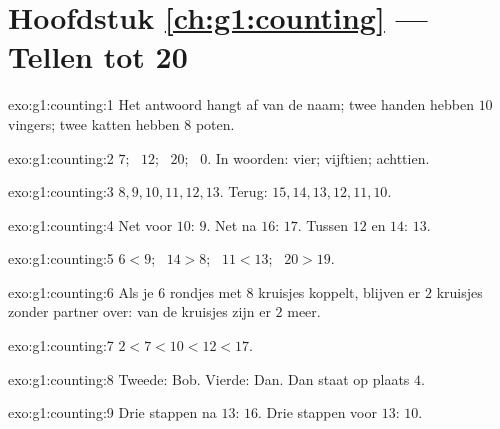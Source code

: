 \section*{Hoofdstuk \ref{ch:g1:counting} --- Tellen tot 20}

\begin{solution}{exo:g1:counting:1}
Het antwoord hangt af van de naam; twee handen hebben $10$ vingers;
twee katten hebben $8$ poten.
\end{solution}

\begin{solution}{exo:g1:counting:2}
$7$; \ $12$; \ $20$; \ $0$. In woorden: vier; vijftien; achttien.
\end{solution}

\begin{solution}{exo:g1:counting:3}
$8, 9, 10, 11, 12, 13$. Terug: $15, 14, 13, 12, 11, 10$.
\end{solution}

\begin{solution}{exo:g1:counting:4}
Net voor $10$: $9$. Net na $16$: $17$. Tussen $12$ en $14$: $13$.
\end{solution}

\begin{solution}{exo:g1:counting:5}
$6 < 9$; \ $14 > 8$; \ $11 < 13$; \ $20 > 19$.
\end{solution}

\begin{solution}{exo:g1:counting:6}
Als je $6$ rondjes met $8$ kruisjes koppelt, blijven er $2$ kruisjes
zonder partner over: van de kruisjes zijn er $2$ meer.
\end{solution}

\begin{solution}{exo:g1:counting:7}
$2 < 7 < 10 < 12 < 17$.
\end{solution}

\begin{solution}{exo:g1:counting:8}
Tweede: Bob. Vierde: Dan. Dan staat op plaats $4$.
\end{solution}

\begin{solution}{exo:g1:counting:9}
Drie stappen na $13$: $16$. Drie stappen voor $13$: $10$.
\end{solution}
